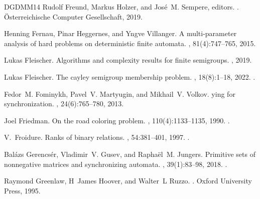 \documentclass[11pt,a4paper]{amsart}
\theoremstyle{plain}
\theoremstyle{definition}
\theoremstyle{defC}
\theoremstyle{thmC}
\theoremstyle{plain}
\numberwithin{equation}{section}
\begin{document}
\begin{thebibliography}{DGDMM14}
Rudolf Freund, Markus Holzer, and Jos{\'{e}}~M. Sempere, editors.
.
  {\"{O}}sterreichische Computer Gesellschaft, 2019.

Henning Fernau, Pinar Heggernes, and Yngve Villanger.
\newblock A multi-parameter analysis of hard problems on deterministic finite
  automata.
, 81(4):747--765, 2015.

Lukas Fleischer.
\newblock Algorithms and complexity results for finite semigroups.
, 2019.

Lukas Fleischer.
\newblock The cayley semigroup membership problem.
, 18(8):1--18, 2022.
\newblock \href {https://doi.org/10.4086/toc.2022.v018a008}
  {}.

Fedor~M. Fominykh, Pavel~V. Martyugin, and Mikhail~V. Volkov.
ying for synchronization.
,
  24(6):765--780, 2013.

Joel Friedman.
\newblock On the road coloring problem.
,
  110(4):1133--1135, 1990.
\newblock \href {https://doi.org/10.1007/s11856-009-0062-5}
  {}.

V.~Froidure.
\newblock Ranks of binary relations.
, 54:381--401, 1997.
\newblock \href {https://doi.org/10.1007/BF02676619}
  {}.

Bal\'{a}zs Gerencs\'{e}r, Vladimir~V. Gusev, and Rapha\"{e}l~M. Jungers.
\newblock Primitive sets of nonnegative matrices and synchronizing automata.
, 39(1):83--98,
  2018.
\newblock \href {https://doi.org/10.1137/16M1094099}
  {}.

Raymond Greenlaw, H~James Hoover, and Walter~L Ruzzo.
.
\newblock Oxford University Press, 1995.


\end{thebibliography}
\end{document}
